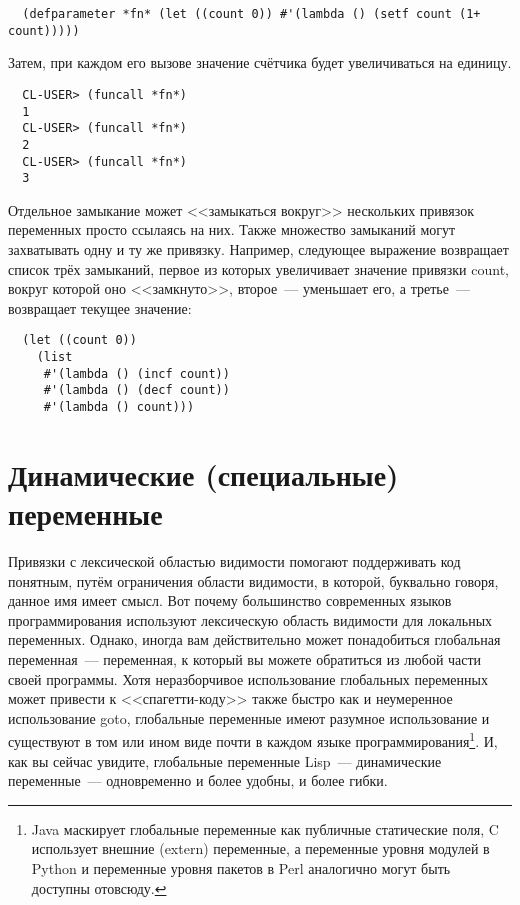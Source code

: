 \begin{lstlisting}
  (defparameter *fn* (let ((count 0)) #'(lambda () (setf count (1+ count)))))
\end{lstlisting}

Затем, при каждом его вызове значение счётчика будет увеличиваться на единицу.

\begin{verbatim}
  CL-USER> (funcall *fn*)
  1
  CL-USER> (funcall *fn*)
  2
  CL-USER> (funcall *fn*)
  3
\end{verbatim}

Отдельное замыкание может <<замыкаться вокруг>> нескольких привязок переменных просто
ссылаясь на них. Также множество замыканий могут захватывать одну и ту же
привязку. Например, следующее выражение возвращает список трёх замыканий, первое из
которых увеличивает значение привязки count, вокруг которой оно <<замкнуто>>, второе~---
уменьшает его, а третье~--- возвращает текущее значение:

\begin{lstlisting}
  (let ((count 0))
    (list
     #'(lambda () (incf count))
     #'(lambda () (decf count))
     #'(lambda () count)))
\end{lstlisting}

\section{Динамические (специальные) переменные}

Привязки с лексической областью видимости помогают поддерживать код понятным, путём
ограничения области видимости, в которой, буквально говоря, данное имя имеет смысл. Вот
почему большинство современных языков программирования используют лексическую область
видимости для локальных переменных. Однако, иногда вам действительно может понадобиться
глобальная переменная~--- переменная, к который вы можете обратиться из любой части своей
программы. Хотя неразборчивое использование глобальных переменных может привести к
<<спагетти-коду>> также быстро как и неумеренное использование goto, глобальные переменные
имеют разумное использование и существуют в том или ином виде почти в каждом языке
программирования\footnote{Java маскирует глобальные переменные как публичные статические
  поля, C использует внешние (extern) переменные, а переменные уровня модулей в Python и
  переменные уровня пакетов в Perl аналогично могут быть доступны отовсюду.}. И, как вы
сейчас увидите, глобальные переменные Lisp~--- динамические переменные~--- одновременно и
более удобны, и более гибки.

